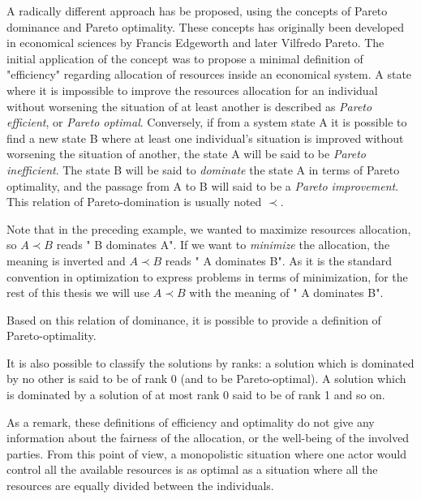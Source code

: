 A radically different approach has be proposed, using the concepts of Pareto dominance and Pareto optimality. These concepts has originally been developed in economical sciences by Francis Edgeworth and later Vilfredo Pareto. The initial application of the concept was to propose a minimal definition of "efficiency" regarding allocation of resources inside an economical system. A state where it is impossible to improve the resources allocation for an individual without worsening the situation of at least another is described as \emph{Pareto efficient}, or \emph{Pareto optimal}.
Conversely, if from a system state A it is possible to find a new state B where at least one individual's situation is improved without worsening the situation of another, the state A will be said to be \emph{Pareto inefficient}. The state B will be said to \emph{dominate} the state A in terms of Pareto optimality, and the passage from A to B will said to be a \emph{Pareto improvement}. This relation of Pareto-domination is usually noted \(\prec\).


Note that in the preceding example, we wanted to maximize resources allocation, so \(A \prec B\) reads " B dominates A". If we want to \emph{minimize} the allocation, the meaning is inverted and  \(A \prec B\) reads " A dominates B".
As it is the standard convention in optimization to express problems in terms of minimization, for the rest of this thesis we will use \(A \prec B\) with the meaning of " A dominates B".

Based on this relation of dominance, it is possible to provide a definition of Pareto-optimality.



It is also possible to classify the solutions by ranks: a solution which is dominated by no other is said to be of rank 0 (and to be Pareto-optimal). A solution which is dominated by a solution of at most rank 0 said to be of rank 1 and so on.

As a remark, these definitions of efficiency and optimality do not give any information about the fairness of the allocation, or the well-being of the involved parties. From this point of view, a monopolistic situation where one actor would control all the available resources is as optimal as a situation where all the resources are equally divided between the individuals.

